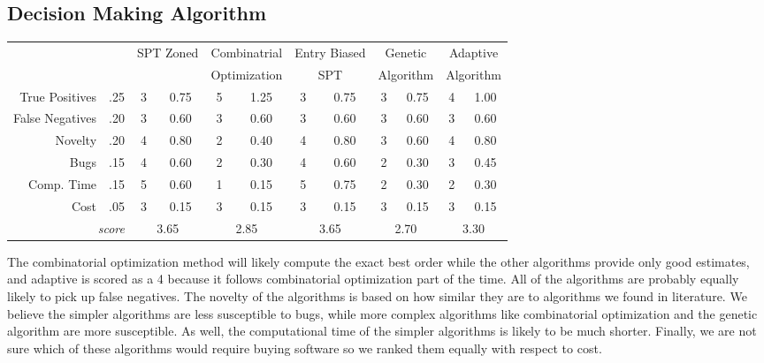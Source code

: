 \documentclass [11pt ]{ report}
\begin{document}
\subsection{Decision Making Algorithm}
\begin{center}
  \begin{tabular}{r|r||c|c||c|c||c|c||c|c||c|c||}
                   \multicolumn{2}{c||}{} 
                     & \multicolumn{2}{c||}{SPT Zoned}  
                     & \multicolumn{2}{c||}{Combinatrial}
                     & \multicolumn{2}{c||}{Entry Biased}
                     & \multicolumn{2}{c||}{Genetic} 
                     & \multicolumn{2}{c||}{Adaptive} \\ 
                   \multicolumn{2}{c||}{} 
                     & \multicolumn{2}{c||}{}  
                     & \multicolumn{2}{c||}{Optimization}
                     & \multicolumn{2}{c||}{SPT}
                     & \multicolumn{2}{c||}{Algorithm} 
                     & \multicolumn{2}{c||}{Algorithm} \\ \hline
  True Positives     & .25 &  3  &   0.75  & 5  &  1.25 & 3  & 0.75 & 3 & 0.75 & 4 & 1.00\\
  False Negatives    & .20 &  3  &   0.60  & 3  & 0.60  & 3  & 0.60 & 3 & 0.60 & 3 & 0.60\\
  Novelty            & .20 &  4   &   0.80  & 2  & 0.40  & 4  & 0.80 & 3 & 0.60 & 4 &0.80\\
  Bugs               & .15 &  4   &   0.60  & 2  & 0.30  & 4  & 0.60 & 2 & 0.30 & 3 &0.45\\
  Comp. Time         & .15 &  5   &   0.60   & 1  & 0.15  & 5  & 0.75 & 2 & 0.30 & 2 &0.30\\
  Cost 				 & .05 &  3   &   0.15   & 3  & 0.15  & 3  & 0.15 & 3 & 0.15 & 3 &0.15\\
  \hline
  \multicolumn{2}{r||}{\emph{score}} & 
  \multicolumn{2}{c||}{3.65 }  &
  \multicolumn{2}{c||}{2.85 } &
  \multicolumn{2}{c||}{3.65 } &
  \multicolumn{2}{c||}{2.70 } & 
  \multicolumn{2}{c||}{3.30 }
\end{tabular}
\end{center}

The combinatorial optimization method will likely compute the exact best order while the other algorithms provide only good estimates, and adaptive is scored as a 4 because it follows combinatorial optimization part of the time. All of the algorithms are probably equally likely to pick up false negatives. The novelty of the algorithms is based on how similar they are to algorithms we found in literature. We believe the simpler algorithms are less susceptible to bugs, while more complex algorithms like combinatorial optimization and the genetic algorithm are more susceptible. As well, the computational time of the simpler algorithms is likely to be much shorter. Finally, we are not sure which of these algorithms would require buying software so we ranked them equally with respect to cost.
\end{document}
